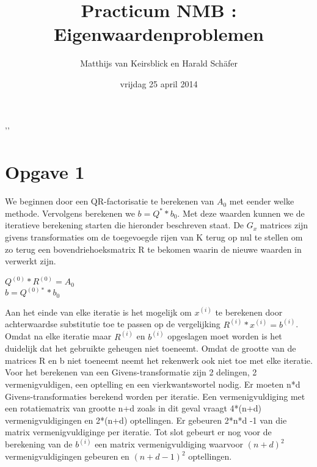 \documentclass[]{article}
\title{Practicum NMB : Eigenwaardenproblemen}
\author{Matthijs van Keirsblick en Harald Schäfer}
\date{vrijdag 25 april 2014}
\newcommand{\opgave}[1]{\section*{Opgave #1}}
\begin{document}
'\blindtext'

\maketitle
\opgave{1}

We beginnen door een QR-factorisatie te berekenen van $A_{0}$ met eender welke methode. Vervolgens berekenen we $b = Q^{*}*b_{0}$. Met deze waarden kunnen we de iteratieve berekening starten die hieronder beschreven staat. De $G_{x}$ matrices zijn givens transformaties om de toegevoegde rijen van K terug op nul te stellen om zo terug een bovendriehoeksmatrix R te bekomen waarin de nieuwe waarden in verwerkt zijn.

\begin{framed}

\begin{algorithm}[H] 
 $Q^{(0)}*R^{(0)} = A_{0}$\\
 $b = Q^{(0)*}*b_{0}$\\
 
 
\end{algorithm}

\end{framed}
Aan het einde van elke iteratie is het mogelijk om $x^{(i)}$ te berekenen door achterwaardse substitutie toe te passen op de vergelijking $R^{(i)}*x^{(i)} = b^{(i)}$. Omdat na elke iteratie maar $R^{(i)}$ en  $b^{(i)}$ opgeslagen moet worden is het duidelijk dat het gebruikte geheugen niet toeneemt. Omdat de grootte van de matrices R en b niet toeneemt neemt het rekenwerk ook niet toe met elke iteratie. Voor het berekenen van een Givens-transformatie zijn 2 delingen, 2 vermenigvuldigen, een optelling en een vierkwantswortel nodig. Er moeten n*d Givens-transformaties berekend worden per iteratie. Een vermenigvuldiging met een rotatiematrix van grootte n+d zoals in dit geval vraagt 4*(n+d) vermenigvuldigingen en 2*(n+d) optellingen. Er gebeuren 2*n*d -1 van die matrix vermenigvuldiginge per iteratie. Tot slot  gebeurt er nog voor de berekening van de $b^{(i)}$ een matrix vermenigvuldiging waarvoor $(n+d)^2$ vermenigvuldigingen gebeuren en $(n+d-1)^2$ optellingen.
\end{document}
